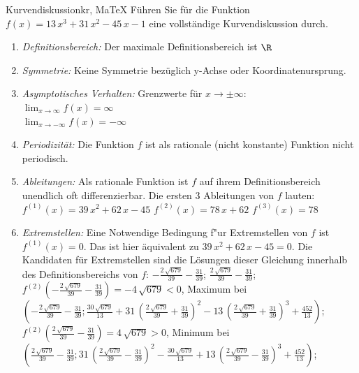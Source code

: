  \providecommand{\MoIl}{(} 
 \providecommand{\MoIr}{)}
 \providecommand{\MIntvlSep}{;} 
 \providecommand{\MElSetSep}{;} 
 \begin{MAufgabe}{Kurvendiskussion}{kr, MaTeX}
 F\"uhren Sie f\"ur die Funktion $f(x)=13\, x^3 + 31\, x^2 - 45\, x - 1$ eine vollst\"andige Kurvendiskussion durch.\\ 
 \ifLsg\Loesung
 \begin{enumerate}
 \item \emph{Definitionsbereich:} 
 Der maximale Definitionsbereich ist $\R$\item \emph{Symmetrie:} 
 Keine Symmetrie bez\"uglich y-Achse oder Koordinatenursprung.\item \emph{Asymptotisches Verhalten:} 
 Grenzwerte f\"ur $x\rightarrow \pm \infty$: \\ 
 $\lim_{x\rightarrow \infty} f(x)=\infty$ \\ 
 $\lim_{x\rightarrow -\infty} f(x)=- \infty$ \\ 
 \item \emph{Periodizit\"at:} 
 Die Funktion $f$ ist als rationale (nicht konstante) Funktion nicht periodisch.\item \emph{Ableitungen:} 
 Als rationale Funktion ist $f$ auf ihrem Definitionsbereich unendlich oft differenzierbar. 
 Die ersten 3 Ableitungen von $f$ lauten: \\ 
 $f^{(1)}(x)=39\, x^2 + 62\, x - 45$\newline 
  $f^{(2)}(x)=78\, x + 62$\newline 
  $f^{(3)}(x)=78$\newline 
  \item \emph{Extremstellen:} 
 Eine Notwendige Bedingung f"ur Extremstellen von $f$ ist $f^{(1)}(x)=0$. 
 Das ist hier \"aquivalent zu $39\, x^2 + 62\, x - 45=0$. 
 Die Kandidaten f\"ur Extremstellen sind die L\"osungen dieser Gleichung innerhalb des Definitionsbereichs von $f$: $ - \frac{2\, \sqrt{679}}{39} - \frac{31}{39}$; $\frac{2\, \sqrt{679}}{39} - \frac{31}{39}$; \\ 
 $f^{(2)}( - \frac{2\, \sqrt{679}}{39} - \frac{31}{39})=- 4\, \sqrt{679}$$<0$, Maximum bei $( - \frac{2\, \sqrt{679}}{39} - \frac{31}{39};\frac{30\, \sqrt{679}}{13} + 31\, {\left(\frac{2\, \sqrt{679}}{39} + \frac{31}{39}\right)}^2 - 13\, {\left(\frac{2\, \sqrt{679}}{39} + \frac{31}{39}\right)}^3 + \frac{452}{13})$; \\ 
 $f^{(2)}(\frac{2\, \sqrt{679}}{39} - \frac{31}{39})=4\, \sqrt{679}$$>0$, Minimum bei $(\frac{2\, \sqrt{679}}{39} - \frac{31}{39};31\, {\left(\frac{2\, \sqrt{679}}{39} - \frac{31}{39}\right)}^2 - \frac{30\, \sqrt{679}}{13} + 13\, {\left(\frac{2\, \sqrt{679}}{39} - \frac{31}{39}\right)}^3 + \frac{452}{13})$; \\ 

\end{enumerate}
\end{MAufgabe}
